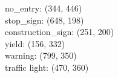 no_entry: (344, 446) \\
stop_sign: (648, 198) \\
construction_sign: (251, 200) \\
yield: (156, 332) \\
warning: (799, 350) \\
traffic light: (470, 360)
